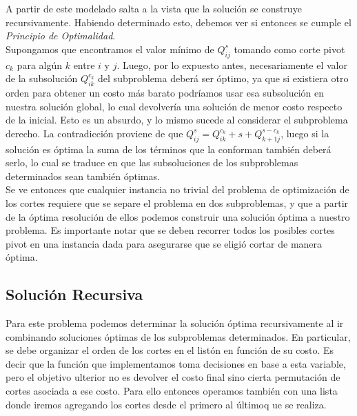 A partir de este modelado salta a la vista que la solución se construye recursivamente. Habiendo determinado esto, debemos ver si entonces se cumple el \textsl{Principio de Optimalidad}.\\
\indent Supongamos que encontramos el valor mínimo de $Q^{s}_{ij}$ tomando como corte pivot $c_k$ para algún $k$ entre $i$ y $j$. Luego, por lo expuesto antes, necesariamente el valor de la subsolución $Q^{c_k}_{ik}$ del subproblema deberá ser óptimo, ya que si existiera otro orden para obtener un costo más barato podríamos usar esa subsolución en nuestra solución global, lo cual devolvería una solución de menor costo respecto de la inicial. Esto es un absurdo, y lo mismo sucede al considerar el subproblema derecho. La contradicción proviene de que $Q^{s}_{ij} = Q^{c_k}_{ik} + s + Q^{s-c_k}_{k+1j}$, luego si la solución es óptima la suma de los términos que la conforman también deberá serlo, lo cual se traduce en que las subsoluciones de los subproblemas determinados sean también óptimas.\\
\indent Se ve entonces que cualquier instancia no trivial del problema de optimización de los cortes requiere que se separe el problema en dos subproblemas, y que a partir de la óptima resolución de ellos podemos construir una solución óptima a nuestro problema. Es importante notar que se deben recorrer todos los posibles cortes pivot en una instancia dada para asegurarse que se eligió cortar de manera óptima.\\

\subsection{Solución Recursiva}

Para este problema podemos determinar la solución óptima recursivamente al ir combinando soluciones óptimas de los subproblemas determinados. En particular, se debe organizar el orden de los cortes en el listón en función de su costo. Es decir que la función que implementamos toma decisiones en base a esta variable, pero el objetivo ulterior no es devolver el costo final sino cierta permutación de cortes asociada a ese costo. Para ello entonces operamos también con una lista donde iremos agregando los cortes desde el primero al últimoq ue se realiza.\\

